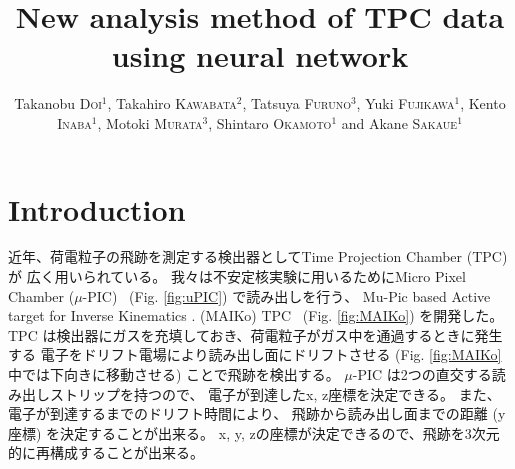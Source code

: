 \documentclass{jps-cp}
\title{New analysis method of TPC data using neural network}
\author{
  Takanobu \textsc{Doi}$^{1}$, Takahiro \textsc{Kawabata}$^{2}$, Tatsuya \textsc{Furuno}$^{3}$,
  Yuki \textsc{Fujikawa}$^{1}$, Kento \textsc{Inaba}$^{1}$, Motoki \textsc{Murata}$^{3}$,
  Shintaro \textsc{Okamoto}$^{1}$ and Akane \textsc{Sakaue}$^{1}$}
\begin{document}
\maketitle

\section{Introduction}
近年、荷電粒子の飛跡を測定する検出器としてTime Projection Chamber (TPC) が
広く用いられている。
我々は不安定核実験に用いるためにMicro Pixel Chamber ($\mu$-PIC)~\cite{mupic} (Fig. \ref{fig:uPIC}) 
で読み出しを行う、
Mu-Pic based Active target for Inverse Kinematics . (MAIKo) TPC~\cite{MAIKo} (Fig. \ref{fig:MAIKo}) を開発した。
TPC は検出器にガスを充填しておき、荷電粒子がガス中を通過するときに発生する
電子をドリフト電場により読み出し面にドリフトさせる
(Fig. \ref{fig:MAIKo} 中では下向きに移動させる) ことで飛跡を検出する。
$\mu$-PIC は2つの直交する読み出しストリップを持つので、
電子が到達したx, z座標を決定できる。
また、電子が到達するまでのドリフト時間により、
飛跡から読み出し面までの距離 (y座標) を決定することが出来る。
x, y, zの座標が決定できるので、飛跡を3次元的に再構成することが出来る。
\end{document}
